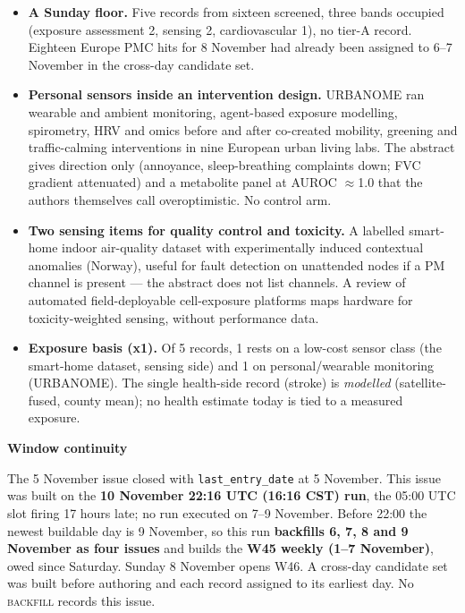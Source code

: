 \documentclass[10pt]{article}
\begin{document}
\footnotesize
\begin{itemize}

\item \textbf{A Sunday floor.} Five records from sixteen screened, three bands occupied (exposure assessment 2, sensing 2, cardiovascular 1), no tier-A record. Eighteen Europe PMC hits for 8 November had already been assigned to 6--7 November in the cross-day candidate set.

\item \textbf{Personal sensors inside an intervention design.} URBANOME ran wearable and ambient monitoring, agent-based exposure modelling, spirometry, HRV and omics before and after co-created mobility, greening and traffic-calming interventions in nine European urban living labs. The abstract gives direction only (annoyance, sleep-breathing complaints down; FVC gradient attenuated) and a metabolite panel at AUROC $\approx$1.0 that the authors themselves call overoptimistic. No control arm.

\item \textbf{Two sensing items for quality control and toxicity.} A labelled smart-home indoor air-quality dataset with experimentally induced contextual anomalies (Norway), useful for fault detection on unattended nodes if a PM channel is present --- the abstract does not list channels. A review of automated field-deployable cell-exposure platforms maps hardware for toxicity-weighted sensing, without performance data.

\item \textbf{Exposure basis (x1).} Of 5 records, 1 rests on a low-cost sensor class (the smart-home dataset, sensing side) and 1 on personal/wearable monitoring (URBANOME). The single health-side record (stroke) is \emph{modelled} (satellite-fused, county mean); no health estimate today is tied to a measured exposure.

\end{itemize}

\vspace{2mm}

\begin{keybox}
{\sffamily\bfseries\footnotesize\color{Deep}Window continuity}\\[1.2mm]
{\fontsize{7.2}{8.8}\selectfont
The 5 November issue closed with \texttt{last\_entry\_date} at 5 November. This issue was built on the \textbf{10 November 22:16 UTC (16:16 CST) run}, the 05:00 UTC slot firing 17 hours late; no run executed on 7--9 November. Before 22:00 the newest buildable day is 9 November, so this run \textbf{backfills 6, 7, 8 and 9 November as four issues} and builds the \textbf{W45 weekly (1--7 November)}, owed since Saturday. Sunday 8 November opens W46. A cross-day candidate set was built before authoring and each record assigned to its earliest day. No \textsc{backfill} records this issue.\par}
\end{keybox}
\end{document}
